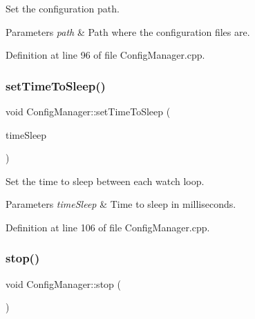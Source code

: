 Set the configuration path. 


\begin{DoxyParams}{Parameters}
{\em path} & Path where the configuration files are. \\
\hline
\end{DoxyParams}


Definition at line 96 of file Config\+Manager.\+cpp.

\mbox{\label{classcfg_1_1_config_manager_a8a84b0efbaf6446b4c9254386606cda5}} 
\subsubsection{\texorpdfstring{set\+Time\+To\+Sleep()}{setTimeToSleep()}}
{\footnotesize\ttfamily void Config\+Manager\+::set\+Time\+To\+Sleep (\begin{DoxyParamCaption}\item[{const \hyperlink{namespacecfg_ab1a8f7060b6dfea6111c4449e81c6f8c}{Time\+Sleep} \&}]{time\+Sleep }\end{DoxyParamCaption})}



Set the time to sleep between each watch loop. 


\begin{DoxyParams}{Parameters}
{\em time\+Sleep} & Time to sleep in milliseconds. \\
\hline
\end{DoxyParams}


Definition at line 106 of file Config\+Manager.\+cpp.

\mbox{\label{classcfg_1_1_config_manager_ae72f47047d91fa0418391aa99b2383ef}} 
\subsubsection{\texorpdfstring{stop()}{stop()}}
{\footnotesize\ttfamily void Config\+Manager\+::stop (\begin{DoxyParamCaption}{ }\end{DoxyParamCaption})}



